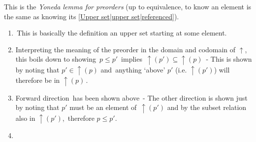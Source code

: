 This is the \emph{Yoneda lemma for preorders} (up to equivalence, to know an element is the same as knowing its \ref{Upper set|upper set|referenced}).
  \begin{enumerate}
    \item \,This is basically the definition an upper set starting at some element.\,
    \item Interpreting the meaning of the preorder in the domain and codomain of $\uparrow$, this boils down to showing \,$p \leq p'$\, implies \,$\uparrow(p') \subseteq \uparrow(p)$\,
          - This is shown by noting that $p' \in \uparrow(p)$ and \,anything `above' $p'$ (i.e. $\uparrow(p')$) will therefore be in $\uparrow(p)$\,.
    \item Forward direction \,has been shown above\,
          - The other direction is shown just by noting that $p\prime$ must be an element of \,$\uparrow(p\prime)$ and by the subset relation also in $\uparrow(p')$,\, therefore $p \leq p'$.
    \item \,  \,
  \end{enumerate}